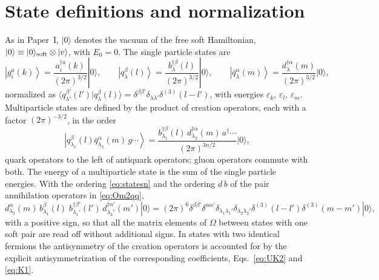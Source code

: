 \documentclass[11pt,a4paper]{article}
\numberwithin{equation}{section}
\newcommand{\eps}{\varepsilon}
\newcommand{\dg}{\dagger}
\newcommand{\dthree}{\delta^{(3)}}
\newcommand{\ket}[1]{\left|#1\right\rangle}
\newcommand{\vac}{|0\rangle}
\newcommand{\OM}{\Omega}
\newcommand{\qk}[3]{q^{#1}_{#2}(#3)}
\newcommand{\aqk}[3]{\bar q^{#1}_{#2}(#3)}
\newcommand{\gl}[3]{g^{#1}_{#2}(#3)}
\begin{document}
\section{State definitions and normalization}
\label{app:states}

As in Paper~I, $\vac$ denotes the vacuum of the free soft Hamiltonian, $\vac\equiv\vac_{\rm soft}\otimes|v\rangle$,
with $E_{0}=0$. The single particle states are
\begin{equation}
\ket{\gl{a}{i}{k}}=\frac{a^{\dg a}_{i}(k)}{(2\pi)^{3/2}}\vac,\qquad
\ket{\qk{\beta}{\lambda}{l}}=\frac{b^{\dg\beta}_{\lambda}(l)}{(2\pi)^{3/2}}\vac,\qquad
\ket{\aqk{\alpha}{\lambda}{m}}=\frac{d^{\dg\alpha}_{\lambda}(m)}{(2\pi)^{3/2}}\vac,
\label{eq:states1}
\end{equation}
normalized as
$\langle\qk{\beta'}{\lambda'}{l'}|\qk{\beta}{\lambda}{l}\rangle=\delta^{\beta\beta'}\delta_{\lambda\lambda'}\dthree(l-l')$,
with energies $\eps_{k}$, $\eps_{l}$, $\eps_{m}$. Multiparticle states are defined by the product of
creation operators, each with a factor $(2\pi)^{-3/2}$, in the order
\begin{equation}
\ket{\qk{\beta}{\lambda_{1}}{l}\aqk{\alpha}{\lambda_{2}}{m}\,g\cdots}=
\frac{b^{\dg\beta}_{\lambda_{1}}(l)\,d^{\dg\alpha}_{\lambda_{2}}(m)\,a^{\dg}\cdots}{(2\pi)^{3n/2}}\vac ,
\label{eq:statesn}
\end{equation}
quark operators to the left of antiquark operators; gluon operators commute with both. The energy of
a multiparticle state is the sum of the single particle energies. With the ordering
\eqref{eq:statesn} and the ordering $d\,b$ of the pair annihilation operators in \eqref{eq:Om2qq},
\begin{equation}
d^{\alpha}_{\lambda_{2}}(m)\,b^{\beta}_{\lambda_{1}}(l)\;b^{\dg\beta'}_{\lambda_{1}'}(l')\,d^{\dg\alpha'}_{\lambda_{2}'}(m')\vac
=(2\pi)^{6}\delta^{\beta\beta'}\delta^{\alpha\alpha'}\delta_{\lambda_{1}\lambda_{1}'}\delta_{\lambda_{2}\lambda_{2}'}
\dthree(l-l')\dthree(m-m')\vac,
\end{equation}
with a positive sign, so that all the matrix elements of $\OM$ between states with one soft pair are
read off without additional signs. In states with two identical fermions the antisymmetry of the
creation operators is accounted for by the explicit antisymmetrization of the corresponding
coefficients, Eqs.~\eqref{eq:UK2} and \eqref{eq:K1}.
\end{document}
